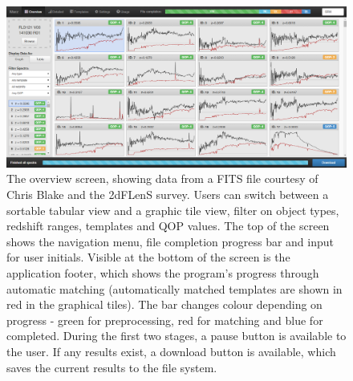 \documentclass[iop]{emulateapj}
\begin{document}
\begin{figure}[H]
\centering
\includegraphics[width=\textwidth]{InterfaceZ.png}
\caption{The overview screen, showing data from a FITS file courtesy of Chris Blake and the 2dFLenS survey. Users can switch between a sortable tabular view and a graphic tile view, filter on object types, redshift ranges, templates and QOP values. The top of the screen shows the navigation menu, file completion progress bar and input for user initials. Visible at the bottom of the screen is the application footer, which shows the program's progress through automatic matching (automatically matched templates are shown in red in the graphical tiles). The bar changes colour depending on progress - green for preprocessing, red for matching and blue for completed. During the first two stages, a pause button is available to the user. If any results exist, a download button is available, which saves the current results to the file system.}
\label{fig:overview}
\end{figure}
\end{document}
